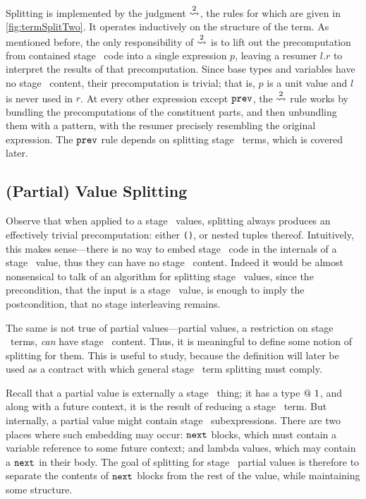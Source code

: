 Splitting is implemented by the judgment $\overset{ 2}\rightsquigarrow$,
the rules for which are given in \cref{fig:termSplitTwo}.  
It operates inductively on the structure of the term.  
As mentioned before, the only responsibility of $\overset{ 2}\rightsquigarrow$ is to lift out the precomputation
from contained stage \bbone\ code into a single expression $p$, 
leaving a resumer $l.r$ to interpret the results of that precomputation.
Since base types and variables have no stage \bbone\ content, their precomputation is trivial;
that is, $p$ is a unit value and $l$ is never used in $r$.
At every other expression except ${\tt prev}$, the $\overset{ 2}\rightsquigarrow$ rule works by bundling 
the precomputations of the constituent parts, and then unbundling them with a pattern,
with the resumer precisely resembling the original expression.
The ${\tt prev}$ rule depends on splitting stage \bbone\ terms, which is covered later.

\subsection{(Partial) Value Splitting}

Observe that when applied to a stage \bbtwo\ values, 
splitting always produces an effectively trivial precomputation:
either \texttt{()}, or nested tuples thereof.
Intuitively, this makes sense---there is no way to embed stage \bbone\ code
in the internals of a stage \bbtwo\ value, 
thus they can have no stage \bbone\ content.
Indeed it would be almost nonsensical to talk of an algorithm for splitting stage \bbtwo\ values,
since the precondition, that the input is a stage \bbtwo\ value, is enough to imply the postcondition,
that no stage interleaving remains.

The same is not true of partial values---partial values, a restriction on stage \bbone\ terms,
{\em can} have stage \bbtwo\ content.
Thus, it is meaningful to define some notion of splitting for them.
This is useful to study, because the definition will later be used as a contract 
with which general stage \bbone\ term splitting must comply.

Recall that a partial value is externally a stage \bbone\ thing; 
it has a type $@~ 1$, and along with a future context, it is the result of reducing a stage \bbone\ term.
But internally, a partial value might contain stage \bbtwo\ subexpressions.
There are two places where such embedding may occur: 
${\tt next}$ blocks, which must contain a variable reference to some future context; 
and lambda values, which may contain a ${\tt next}$ in their body.
The goal of splitting for stage \bbone\ partial values is therefore 
to separate the contents of ${\tt next}$ blocks from the rest of the value, 
while maintaining some structure.

